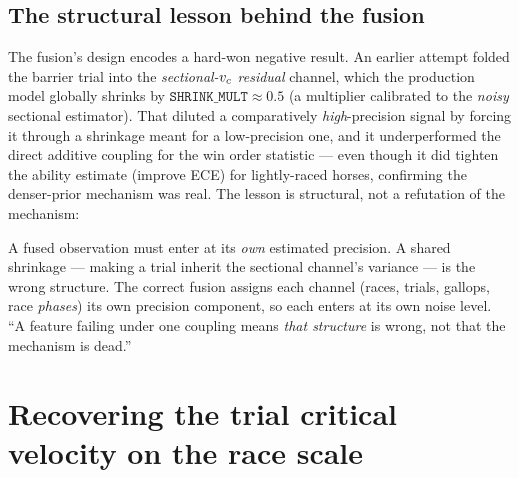 \subsection{The structural lesson behind the fusion}

The fusion's design encodes a hard-won negative result. An earlier attempt folded the barrier
trial into the \emph{sectional-${v_{c}}$ residual} channel, which the production model globally shrinks
by $\texttt{SHRINK\_MULT}\approx 0.5$ (a multiplier calibrated to the \emph{noisy} sectional
estimator). That diluted a comparatively \emph{high}-precision signal by forcing it through a
shrinkage meant for a low-precision one, and it underperformed the direct additive coupling for the
win order statistic --- even though it did tighten the ability estimate (improve ECE) for
lightly-raced horses, confirming the denser-prior mechanism was real. The lesson is structural,
not a refutation of the mechanism:

\begin{principle}
A fused observation must enter at its \emph{own} estimated precision. A shared shrinkage --- making
a trial inherit the sectional channel's variance --- is the wrong structure. The correct fusion
assigns each channel (races, trials, gallops, race \emph{phases}) its own precision component, so
each enters at its own noise level. ``A feature failing under one coupling means \emph{that
structure} is wrong, not that the mechanism is dead.''
\end{principle}

\section{Recovering the trial critical velocity on the race scale}

